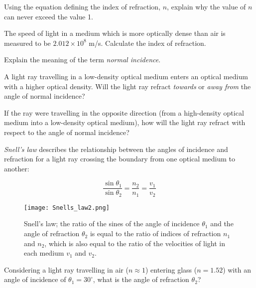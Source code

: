 \documentclass[a4paper, DIV=17]{scrartcl}
\begin{document}
\begin{question}[topic=geometric-optics]
    Using the equation defining the index of refraction, $n$, explain why
    the value of $n$ can never exceed the value 1.
\end{question}

\begin{question}
    The speed of light in a medium which is more optically dense than air is
    measured to be $2.012\times10^8$ m/s.  Calculate the index of
    refraction.
\end{question}

\begin{question}
Explain the meaning of the term \emph{normal incidence}.
\end{question}

\begin{question}
A light ray travelling in a low-density optical medium enters an optical
medium with a higher optical density.  Will the light ray refract
\emph{towards} or \emph{away from} the angle of normal incidence?

If the ray were travelling in the opposite direction (from a high-density
optical medium into a low-density optical medium), how will the light ray
refract with respect to the angle of normal incidence?
\end{question}

\begin{question}
\emph{Snell's law} describes the relationship between the angles of
incidence and refraction for a light ray crossing the boundary from one
optical medium to another:

\begin{equation}
    \frac{\sin \theta_1}{\sin \theta_2} = \frac{n_2}{n_1} = \frac{v_1}{v_2}
\end{equation}

\begin{figure}[h]
    \centerline{\texttt{[image: Snells\_law2.png]}}
    \caption{Snell's law; the ratio of the sines of the angle of incidence
    $\theta_1$ and the angle of refraction $\theta_2$ is equal to the ratio
    of indices of refraction $n_1$ and $n_2$, which is also equal to the
    ratio of the velocities of light in each medium $v_1$ and $v_2$.}
\end{figure}

    Considering a light ray travelling in air ($n \approx 1$) entering glass
    ($n = 1.52$) with an angle of incidence of $\theta_1 = 30^\circ$,
    what is the angle of refraction $\theta_2$?
\end{question}
\end{document}
